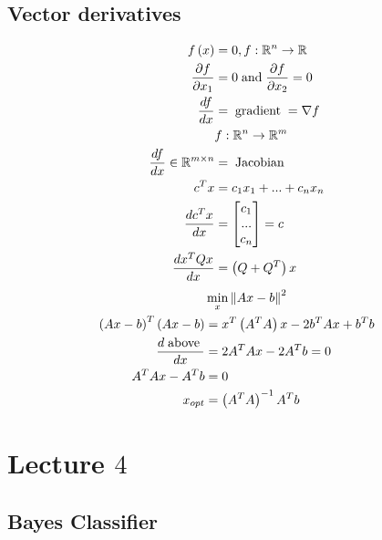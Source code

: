 \documentclass{article}
\begin{document}
\subsection{Vector derivatives}
\begin{align*}
f\left(x\right)  &= 0, f:\mathbb{R}^{n} \to  \mathbb{R}
\\ \dfrac{\partial f}{\partial x_{1}} &= 0 \text{\;and\;} \dfrac{\partial f}{\partial x_{2}} = 0
\\ \dfrac{d f}{d x} &= \text{\;gradient\;} = \nabla  f 
\\ &f  : \mathbb{R}^{n} \to  \mathbb{R}^{m}
\\ \dfrac{d f}{d x} \in \mathbb{R}^{m \times n} &= \text{\;Jacobian\;}
\\ c^{T} x &= c_{1} x_{1} + ... + c_{n} x_{n}
\\ \dfrac{d c^{T} x}{d x} &= \begin{bmatrix} c_{1} \\ ... \\ c_{n} \end{bmatrix} = c 
\\ \dfrac{d x^{T} Q x}{d x} &= \left(Q + Q^{T}\right) x 
\end{align*}
\begin{align*}
&\displaystyle\min_{x} \left\| A x - b \right\|^{2}
\\ \left(A  x - b\right)^{T} \left(A x - b\right) &= x^{T} \left(A^{T} A\right) x - 2 b^{T} A x + b^{T} b 
\\ \dfrac{d \text{\;above\;}}{d x} &= 2 A^{T} A x - 2 A^{T} b = 0
\\ A^{T}  A x - A^{T} b &= 0
\\ x_{opt} &= \left(A^{T} A\right)^{-1} A^{T} b 
\end{align*}





\section{Lecture $4$} 


\subsection{Bayes Classifier}
\end{document}
